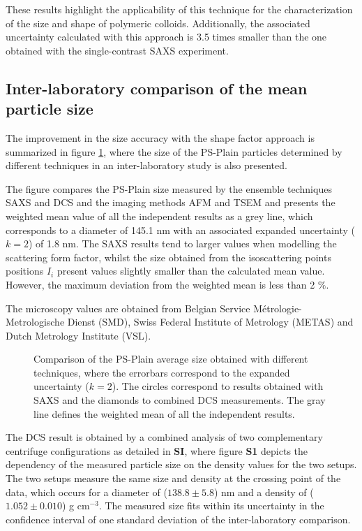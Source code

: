 These results highlight the applicability of this technique for the characterization of the size and shape of polymeric colloids. Additionally, the associated uncertainty calculated with this approach is 3.5 times smaller than the one obtained with the single-contrast SAXS experiment. 

\subsection{Inter-laboratory comparison of the mean particle size}
The improvement in the size accuracy with the shape factor approach is summarized in figure \ref{fig:PSPlainSizeComparison}, where the size of the PS-Plain particles determined by different techniques in an inter-laboratory study is also presented\citep{nicolet_interlaboratory_2015}.

The figure compares the PS-Plain size measured by the ensemble techniques SAXS and DCS and the imaging methods AFM and TSEM and presents the weighted mean value of all the independent results as a grey line, which corresponds to a diameter of 145.1 nm with an associated expanded uncertainty ($k=2$) of 1.8 nm. The SAXS results tend to larger values when modelling the scattering form factor, whilst the size obtained from the isoscattering points positions $I_i$ present values slightly smaller than the calculated mean value. However, the maximum deviation from the weighted mean is less than 2 $\%$.

The microscopy values are obtained from Belgian Service Métrologie-Metrologische Dienst (SMD), Swiss Federal Institute of Metrology (METAS) and Dutch Metrology Institute (VSL).

\begin{figure}
	\centering
		
	\caption{Comparison of the PS-Plain average size obtained with different techniques, where the errorbars correspond to the expanded uncertainty ($k=2$). The circles correspond to results obtained with SAXS and the diamonds to combined DCS measurements. The gray line defines the weighted mean of all the independent results.}
	\label{fig:PSPlainSizeComparison}
\end{figure}

The DCS result is obtained by a combined analysis of two complementary centrifuge configurations as detailed in \textbf{SI}, where figure \textbf{S1} depicts the dependency of the measured particle size on the density values for the two setups. The two setups measure the same size and density at the crossing point of the data, which occurs for a diameter of ($138.8\pm5.8$) nm and a density of ($1.052\pm0.010$) g cm$^{-3}$. The measured size fits within its uncertainty in the confidence interval of one standard deviation of the inter-laboratory comparison.
 
